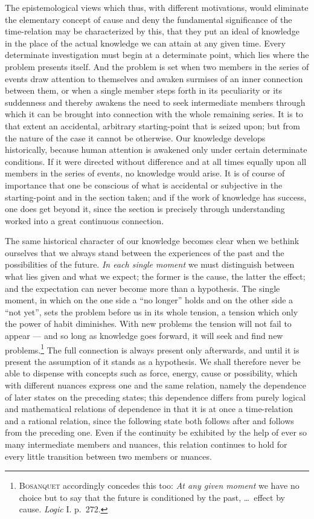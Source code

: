 \documentclass[12pt,a4paper]{book}
\newcommand{\opage}[1]{\marginnote{\footnotesize\textit{[#1]}}}
\begin{document}
The epistemological views which thus, with different motivations, would
eliminate the elementary concept of cause and deny the fundamental significance
of the time-relation may be characterized by this, that they put an ideal of
knowledge in the place of the actual knowledge we can attain at any given time.
Every determinate investigation must begin at a determinate point, which lies
where the problem presents itself. And the problem is set when two members in the
series of events draw attention to themselves and awaken surmises of an inner
connection between them, or when a single member steps forth in its peculiarity
or its suddenness and thereby awakens the need to seek intermediate members
through which it can be brought into connection with the whole remaining series.
It is to that extent an \opage{46}accidental, arbitrary starting-point that is seized upon;
but from the nature of the case it cannot be otherwise. Our knowledge develops
historically, because human attention is awakened only under certain determinate
conditions. If it were directed without difference and at all times equally upon
all members in the series of events, no knowledge would arise. It is of course of
importance that one be conscious of what is accidental or subjective in the
starting-point and in the section taken; and if the work of knowledge has
success, one does get beyond it, since the section is precisely through
understanding worked into a great continuous connection.

The same historical character of our knowledge becomes clear when we bethink
ourselves that we always stand between the experiences of the past and the
possibilities of the future. \emph{In each single moment} we must distinguish
between what lies given and what we expect; the former is the cause, the latter
the effect; and the expectation can never become more than a hypothesis. The
single moment, in which on the one side a ``no longer'' holds and on the other
side a ``not yet'', sets the problem before us in its whole tension, a tension
which only the power of habit diminishes. With new problems the tension will not
fail to appear --- and so long as knowledge goes forward, it will seek and find
new problems.\footnote{\textsc{Bosanquet} accordingly concedes this too:
\textit{At any given moment} we have no choice but to say that the future is
conditioned by the past, \dots\ effect by cause. \textit{Logic} I. p.~272.} The
full connection is always present only afterwards, and until it is present the
assumption of it stands as a hypothesis. We shall therefore never be able to
dispense with concepts such as force, energy, cause or possibility, which with
different nuances express one and the same relation, namely the dependence of
later states on the preceding states; this dependence differs from purely logical
and mathematical relations of dependence in that it is at once a time-relation
and a rational relation, since the following state both follows after and follows
from the preceding one. Even if the continuity be exhibited by the help of ever
so many intermediate members and nuances, this relation continues to hold for
every little transition between two members or nuances.
\end{document}
